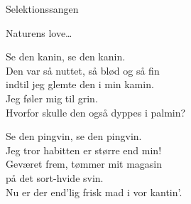 \begin{song}{Selektionssangen}
  \begin{SBChorus}
    Naturens love\ldots
  \end{SBChorus}

  \begin{SBVerse}
    Se den kanin, se den kanin.\\
    Den var så nuttet, så blød og så fin\\
    indtil jeg glemte den i min kamin.\\
    Jeg føler mig til grin.\\
    Hvorfor skulle den også dyppes i palmin?
  \end{SBVerse}

  \begin{SBVerse}
    Se den pingvin, se den pingvin.\\
    Jeg tror habitten er større end min!\\
    Geværet frem, tømmer mit magasin\\
    på det sort-hvide svin.\\
    Nu er der end'lig frisk mad i vor kantin'.
  \end{SBVerse}
\end{song}
\endsong